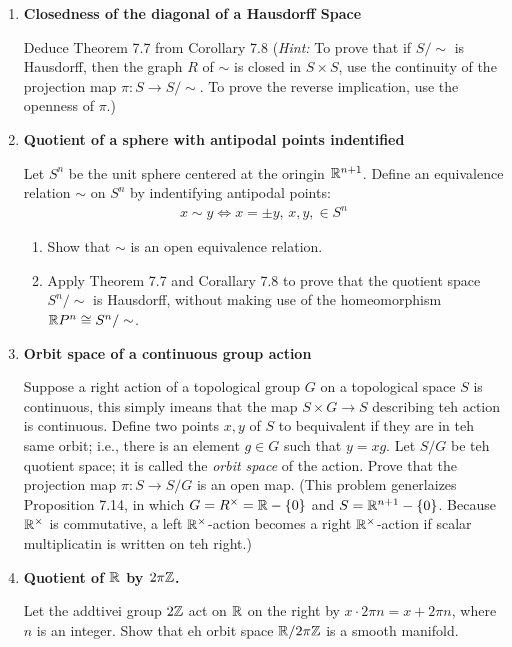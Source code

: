 \documentclass[10pt,a4paper]{report}
\begin{document}
\begin{enumerate}[label=7.\arabic*.]
	\item \textbf{Closedness of the diagonal of a Hausdorff Space}
	
	Deduce Theorem 7.7 from Corollary 7.8 (\textit{Hint:} To prove that if $S/\sim$ is Hausdorff, then the graph $R$ of $\sim$ is closed in $S \times S$, use the continuity of the projection map $\pi:S \to S/\sim$.  To prove the reverse implication, use the openness of $\pi$.)
	
	\item \textbf{Quotient of a sphere with antipodal points indentified}
	
	Let $S^n$ be the unit sphere centered at the oringin $\mathbb{R}^{n+1}$.  Define an equivalence relation $\sim$ on $S^n$ by indentifying antipodal points:
	\begin{align*}
		x \sim y \iff x=\pm y, \, x,y, \in S^n
	\end{align*}\begin{enumerate}[label=(\alph*)]
		\item Show that $\sim$ is an open equivalence relation.
		\item Apply Theorem 7.7 and Corallary 7.8 to prove that the quotient space $S^n/\sim$ is Hausdorff, without making use of the homeomorphism $\mathbb{R} P^n \cong S^n/\sim$.
	\end{enumerate}
	
	\item \textbf{Orbit space of a continuous group action}
	
	Suppose a right action of a topological group $G$ on a topological space $S$ is continuous, this simply imeans that the map $S \times G \to S$ describing teh action is continuous.  Define two points $x,y$ of $S$ to bequivalent if they are in teh same orbit; i.e., there is an element $g \in G$ such that $y=xg$.  Let $S/G$ be teh quotient space; it is called the \textit{orbit space} of the action.  Prove that the projection map $\pi: S \to S/G$ is an open map.  (This problem generlaizes Proposition 7.14, in which $G=R^\times = \mathbb{R}-\{0\}$ and $S = \mathbb{R}^{n+1}-\{0\}$.  Because $\mathbb{R}^\times$ is commutative, a left $\mathbb{R}^\times$-action becomes a right $\mathbb{R}^\times$-action if scalar multiplicatin is written on teh right.)
	
	\item \textbf{Quotient of $\mathbb{R}$ by $2\pi\mathbb{Z}$.}
	
	Let the addtivei group $2\mathbb{Z}$ act on $\mathbb{R}$ on the right by $x\cdot 2\pi n=x+2\pi n$, where $n$ is an integer.  Show that eh orbit space $\mathbb{R}/2\pi\mathbb{Z}$ is a smooth manifold.
	

\end{enumerate}
\end{document}
